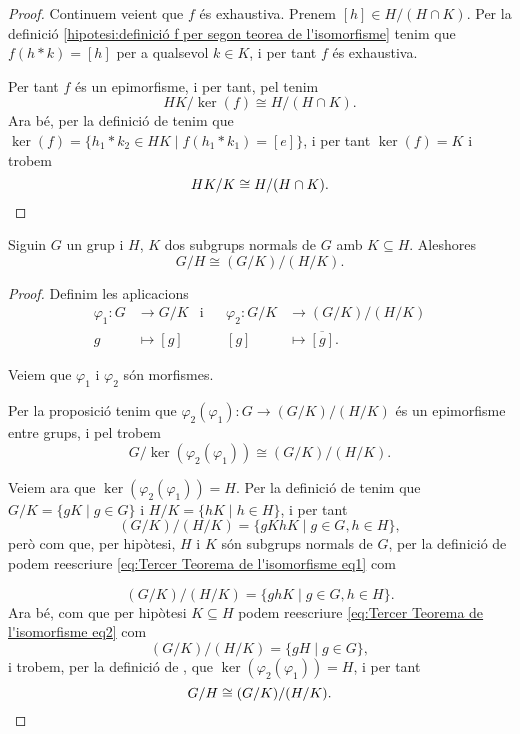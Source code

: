 \documentclass[../Apunts.tex]{subfiles}
\begin{document}
\begin{theorem}
\begin{proof}
			Continuem veient que \(f\) és exhaustiva. Prenem \([h]\in H/(H\cap K)\). Per la definició \eqref{hipotesi:definició f per segon teorea de l'isomorfisme} tenim que \(f(h\ast k)=[h]\) per a qualsevol \(k\in K\), i per tant \(f\) és exhaustiva.
			
			Per tant \(f\) és un epimorfisme, i per tant, pel  tenim
			\[HK/\ker(f)\cong H/(H\cap K).\]
			Ara bé, per la definició de  tenim que \(\ker(f)=\{h_{1}\ast k_{2}\in HK\mid f(h_{1}\ast k_{1})=[e]\}\), i per tant \(\ker(f)=K\) i trobem
			\[HK/K\cong H/(H\cap K).\qedhere\]
		\end{proof}
	\end{theorem}
	\begin{theorem}
		\label{thm:Tercer Teorema de l'isomorfisme entre grups}
		Siguin \(G\) un grup i \(H\), \(K\) dos subgrups normals de \(G\) amb \(K\subseteq H\). Aleshores
		\[G/H\cong (G/K)/(H/K).\]
		\begin{proof}
			Definim les aplicacions
			\begin{align*}
			\varphi_{1}\colon G&\longrightarrow G/K&\text{i}&&\varphi_{2}\colon G/K&\longrightarrow(G/K)/(H/K)\\
			g&\longmapsto[g]&&&[g]&\longmapsto\overline{[g]}.
			\end{align*}
			
			Veiem que \(\varphi_{1}\) i \(\varphi_{2}\) són morfismes.
			
			Per la proposició  tenim que \(\varphi_{2}(\varphi_{1})\colon G\longrightarrow(G/K)/(H/K)\) és un epimorfisme entre grups, %
			i pel  trobem
			\[G/\ker(\varphi_{2}(\varphi_{1}))\cong(G/K)/(H/K).\]
			
			Veiem ara que \(\ker(\varphi_{2}(\varphi_{1}))=H\). Per la definició de  tenim que \(G/K=\{gK\mid g\in G\}\) i \(H/K=\{hK\mid h\in H\}\), i per tant
			\begin{equation}
			\label{eq:Tercer Teorema de l'isomorfisme eq1}
			(G/K)/(H/K)=\{gKhK\mid g\in G, h\in H\},
			\end{equation}
			però com que, per hipòtesi, \(H\) i \(K\) són subgrups normals de \(G\), per la definició de  podem reescriure \eqref{eq:Tercer Teorema de l'isomorfisme eq1} com
			
			\begin{equation}\label{eq:Tercer Teorema de l'isomorfisme eq2}
			(G/K)/(H/K)=\{ghK\mid g\in G,h\in H\}.
			\end{equation}
			Ara bé, com que per hipòtesi \(K\subseteq H\) podem reescriure \eqref{eq:Tercer Teorema de l'isomorfisme eq2} com
			\[(G/K)/(H/K)=\{gH\mid g\in G\},\]
			i trobem, per la definició de , que \(\ker(\varphi_{2}(\varphi_{1}))=H\), i per tant
			\[G/H\cong (G/K)/(H/K).\qedhere\]
		\end{proof}
	\end{theorem}
\end{document}
